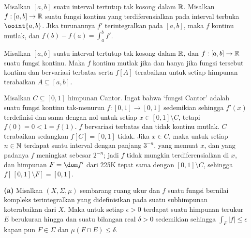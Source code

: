  Misalkan $[a,b]$ suatu interval tertutup tak kosong dalam
$\Bbb R$. Misalkan $f:[a,b]\to\Bbb R$ suatu fungsi kontinu yang
terdiferensialkan pada interval terbuka $\ooint{a,b}$. Jika turunannya
$f'$ terintegralkan pada $[a,b]$, maka $f$ kontinu mutlak, dan
$f(b)-f(a)=\int_a^bf'$.


 Misalkan $[a,b]$ suatu interval tertutup tak kosong dalam
$\Bbb R$, dan $f:[a,b]\to\Bbb R$ suatu fungsi kontinu. Maka $f$
kontinu mutlak jika dan hanya jika fungsi tersebut kontinu dan bervariasi terbatas serta
$f[A]$ terabaikan untuk setiap himpunan terabaikan $A\subseteq[a,b]$.


 Misalkan $C\subseteq[0,1]$ himpunan
Cantor.
Ingat bahwa `fungsi Cantor' adalah suatu fungsi kontinu tak-menurun
$f:[0,1]\to[0,1]$ sedemikian sehingga $f'(x)$ terdefinisi dan sama dengan
nol untuk setiap $x\in[0,1]\setminus C$,
tetapi $f(0)=0<1=f(1)$.  $f$ bervariasi terbatas dan tidak kontinu mutlak. $C$
terabaikan sedangkan $f[C]=[0,1]$ tidak. Jika $x\in C$, maka untuk setiap
$n\in\Bbb N$ terdapat suatu interval dengan panjang $3^{-n}$, yang memuat $x$, dan yang
padanya $f$ meningkat sebesar $2^{-n}$; jadi $f$ tidak mungkin terdiferensialkan di
$x$, dan himpunan $F=\dom f'$ dari 225K tepat sama dengan $[0,1]\setminus C$, sehingga
$f[\,[0,1]\setminus F]=[0,1]$.

 {\bf (a)} Misalkan
$(X,\Sigma,\mu)$ sembarang ruang ukur dan $f$ suatu fungsi
bernilai kompleks terintegralkan
yang didefinisikan pada suatu subhimpunan koterabaikan dari $X$.
Maka untuk setiap $\epsilon>0$ terdapat suatu himpunan terukur
$E$ berukuran hingga dan suatu bilangan real
$\delta>0$ sedemikian sehingga $\int_F|f|\le\epsilon$ kapan pun $F\in\Sigma$ dan
$\mu(F\cap E)\le\delta$. 

